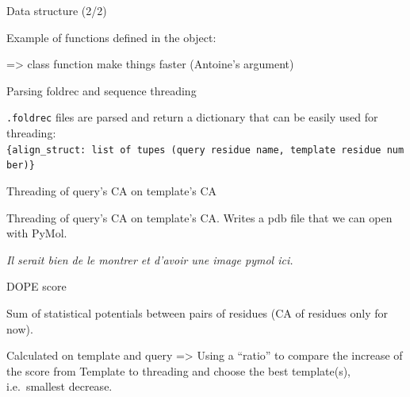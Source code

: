 \begin{frame}[fragile]{Data structure (2/2)}

Example of functions defined in the object:

\begin{Shaded}
\begin{Highlighting}[]
\NormalTok{: }\NormalTok{):}
\OperatorTok{=} \NormalTok{()}
     
        \NormalTok{:}
\OperatorTok{+=}
         \NormalTok{:}
\OperatorTok{+=} 
\end{Highlighting}
\end{Shaded}

=\textgreater{} class function make things faster (Antoine's argument)

\end{frame}

\begin{frame}[fragile]{Parsing foldrec and sequence threading}

\texttt{.foldrec} files are parsed and return a dictionary that can be
easily used for threading:
\texttt{\{align\_struct:\ list\ of\ tupes\ (query\ residue\ name,\ template\ residue\ number)\}}

\end{frame}

\begin{frame}{Threading of query's CA on template's CA}

Threading of query's CA on template's CA. Writes a pdb file that we can
open with PyMol.

\emph{Il serait bien de le montrer et d'avoir une image pymol ici.}

\end{frame}

\begin{frame}{DOPE score}

Sum of statistical potentials between pairs of residues (CA of residues
only for now).

Calculated on template and query =\textgreater{} Using a ``ratio'' to
compare the increase of the score from Template to threading and choose
the best template(s), i.e.~smallest decrease.

\end{frame}

